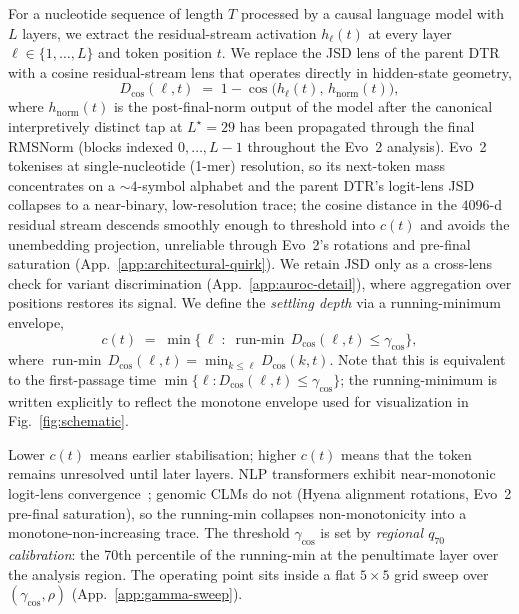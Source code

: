 \documentclass{article}
\theoremstyle{plain}
\theoremstyle{definition}
\theoremstyle{remark}
\newcommand{\hl}{h_{\ell}}
\newcommand{\hnorm}{h_{\mathrm{norm}}}
\newcommand{\Dcos}{D_{\cos}}
\newcommand{\runmin}{\operatorname{run\text{-}min}}
\begin{document}
For a nucleotide sequence of length $T$ processed by a causal language model with $L$ layers, we extract the residual-stream activation $\hl(t)$ at every layer $\ell\!\in\!\{1,\ldots,L\}$ and token position $t$. We replace the JSD lens of the parent DTR~\cite{chen2026deepthinking} with a cosine residual-stream lens that operates directly in hidden-state geometry,
\begin{equation}
  \Dcos(\ell, t) \;=\; 1 - \cos\!\bigl(\hl(t),\, \hnorm(t)\bigr),
  \label{eq:cos-lens}
\end{equation}
where $\hnorm(t)$ is the post-final-norm output of the model after the canonical interpretively distinct tap at $L^\star\!=\!29$ has been propagated through the final RMSNorm (blocks indexed $0,\ldots,L\!-\!1$ throughout the Evo~2 analysis).
Evo~2 tokenises at single-nucleotide (1-mer) resolution, so its next-token mass concentrates on a $\sim\!4$-symbol alphabet and the parent DTR's logit-lens JSD collapses to a near-binary, low-resolution trace; the cosine distance in the $4096$-d residual stream descends smoothly enough to threshold into $c(t)$ and avoids the unembedding projection, unreliable through Evo~2's rotations and pre-final saturation (App.~\ref{app:architectural-quirk}). We retain JSD only as a cross-lens check for variant discrimination (App.~\ref{app:auroc-detail}), where aggregation over positions restores its signal. We define the \emph{settling depth} via a running-minimum envelope,
\begin{equation}
  c(t) \;=\; \min\bigl\{\, \ell \;:\; \runmin\,\Dcos(\ell, t) \le \gamma_{\cos}\bigr\},
  \label{eq:settling}
\end{equation}
where $\runmin\,\Dcos(\ell,t) = \min_{k\le\ell}\Dcos(k,t)$. Note that this is equivalent to the first-passage time $\min\{\ell : D_{\cos}(\ell, t) \leq \gamma_{\cos}\}$; the running-minimum is written explicitly to reflect the monotone envelope used for visualization in Fig.~\ref{fig:schematic}.

Lower $c(t)$ means earlier stabilisation; higher $c(t)$ means that the token remains unresolved until later layers. NLP transformers exhibit near-monotonic logit-lens convergence~\cite{nostalgebraist2020logitlens,belrose2023tunedlens}; genomic CLMs do not (Hyena alignment rotations, Evo~2 pre-final saturation), so the running-min collapses non-monotonicity into a monotone-non-increasing trace. The threshold $\gamma_{\cos}$ is set by \emph{regional $q_{70}$ calibration}: the 70th percentile of the running-min at the penultimate layer over the analysis region. The operating point sits inside a flat $5\!\times\!5$ grid sweep over $(\gamma_{\cos},\rho)$ (App.~\ref{app:gamma-sweep}).
\end{document}
